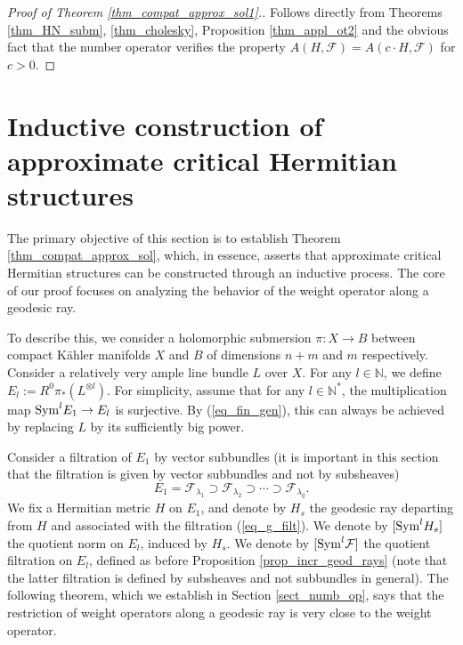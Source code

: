 \documentclass[12pt]{article}
\numberwithin{equation}{section}
\theoremstyle{theorem}
\theoremstyle{definition}
\theoremstyle{remark}
\newcommand{\nat}{\mathbb{N}}
\begin{document}
	\begin{proof}[Proof of Theorem \ref{thm_compat_approx_sol1}.]
		Follows directly from Theorems \ref{thm_HN_subm}, \ref{thm_cholesky}, Proposition \ref{thm_appl_ot2} and the obvious fact that the number operator verifies the property $A(H, \mathcal{F}) = A(c \cdot H, \mathcal{F})$ for $c > 0$.
	\end{proof}
	
	\section{Inductive construction of approximate critical Hermitian structures}\label{sect_induc_const}
	The primary objective of this section is to establish Theorem \ref{thm_compat_approx_sol}, which, in essence, asserts that approximate critical Hermitian structures can be constructed through an inductive process. 
	The core of our proof focuses on analyzing the behavior of the weight operator along a geodesic ray.
	\par 
	To describe this, we consider a holomorphic submersion $\pi : X \to B$ between compact Kähler manifolds $X$ and $B$ of dimensions $n + m$ and $m$ respectively.
	Consider a relatively very ample line bundle $L$ over $X$.
	For any $l \in \nat$, we define $E_l := R^0 \pi_* (L^{\otimes l})$. 
	For simplicity, assume that for any $l \in \nat^*$, the multiplication map ${\rm{Sym}}^l E_1 \to E_l$ is surjective.
	By (\ref{eq_fin_gen}), this can always be achieved by replacing $L$ by its sufficiently big power. 
	\par 
	Consider a filtration of $E_1$ by vector subbundles (it is important in this section that the filtration is given by vector subbundles and not by subsheaves)
	\begin{equation}\label{eq_g_filt}
		E_1 = \mathcal{F}_{\lambda_1} \supset \mathcal{F}_{\lambda_2} \supset \cdots \supset \mathcal{F}_{\lambda_q}.
	\end{equation}
	We fix a Hermitian metric $H$ on $E_1$, and denote by $H_s$ the geodesic ray departing from $H$ and associated with the filtration (\ref{eq_g_filt}).
	We denote by $[{\rm{Sym}}^l H_s]$ the quotient norm on $E_l$, induced by $H_s$.
	We denote by $[{\rm{Sym}}^l \mathcal{F}]$ the quotient filtration on $E_l$, defined as before Proposition \ref{prop_incr_geod_rays} (note that the latter filtration is defined by subsheaves and not subbundles in general).
	The following theorem, which we establish in Section \ref{sect_numb_op}, says that the restriction of weight operators along a geodesic ray is very close to the weight operator.
\end{document}
